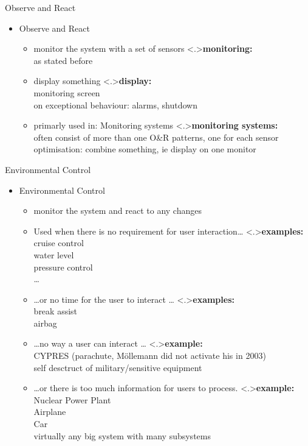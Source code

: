 \documentclass[ngerman={babel}, utf8, bigger, t, xcolor={table,dvipsnames}, ompress, hyperref={bookmarks,colorlinks}]{beamer}
\begin{document}
\begin{frame}{Observe and React}
	\begin{itemize}
		\item Observe and React
		\begin{itemize}
			\item monitor the system with a set of sensors
			\note<.>{\textbf{monitoring:}\\ as stated before}
			\item display something
			\note<.>{\textbf{display:}\\ monitoring screen \\ on exceptional behaviour: alarms, shutdown\\ }
			\item primarly used in: Monitoring systems
			\note<.>{\textbf{monitoring systems:}\\ often consist of more than one O\&R patterns, one for each sensor \\ optimisation: combine something, ie display on one monitor}
		\end{itemize}
	\end{itemize}
\end{frame}

\begin{frame}{Environmental Control}
	\begin{itemize}
		\item Environmental Control
		\begin{itemize}
			\item monitor the system and react to any changes
			\item Used when there is no requirement for user interaction\dots{}
			\note<.>{\textbf{examples:}\\ cruise control \\ water level \\ pressure control \\ \dots }
			\item \dots or no time for the user to interact \dots
			\note<.>{\textbf{examples:}\\ break assist \\ airbag}
			\item \dots no way a user can interact \dots{}
			\note<.>{\textbf{example:}\\ CYPRES {\tiny (parachute, Möllemann did not activate his in 2003)} \\ self desctruct of military/sensitive equipment}
			\item \dots or there is too much information for users to process.
			\note<.>{\textbf{example:}\\ Nuclear Power Plant \\ Airplane \\ Car \\ virtually any big system with many subsystems}
		\end{itemize}
	\end{itemize}
\end{frame}
\end{document}

